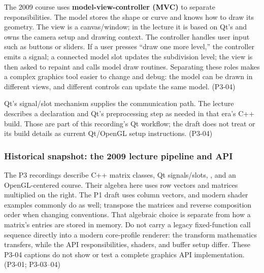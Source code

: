 \hypertarget{03-visual-computing-i-ch018-organize-the-graphics-program-with-model-view-and-controller-roles}{}

The 2009 course uses \textbf{model-view-controller (MVC)} to separate responsibilities. The model stores the shape or curve and knows how to draw its geometry. The view is a canvas/window; in the lecture it is based on Qt's  and owns the camera setup and drawing context. The controller handles user input such as buttons or sliders. If a user presses ``draw one more level,'' the controller emits a signal; a connected model slot updates the subdivision level; the view is then asked to repaint and calls model draw routines. Separating these roles makes a complex graphics tool easier to change and debug: the model can be drawn in different views, and different controls can update the same model. (P3-04)

Qt's signal/slot mechanism supplies the communication path. The lecture describes a  declaration and Qt's  preprocessing step as needed in that era's C++ build. Those are part of this recording's Qt workflow; the draft does not treat  or its build details as current Qt/OpenGL setup instructions. (P3-04)

\subsubsection{Historical snapshot: the 2009 lecture pipeline and API}\label{03-visual-computing-i-ch018-historical-snapshot-the-2009-lecture-pipeline-and-api}

\hypertarget{03-visual-computing-i-ch018-historical-snapshot-the-2009-lecture-pipeline-and-api}{}

The P3 recordings describe C++ matrix classes, Qt signals/slots, , and an OpenGL-centered course. Their algebra here uses row vectors and matrices multiplied on the right. The P1 draft uses column vectors, and modern shader examples commonly do as well; transpose the matrices and reverse composition order when changing conventions. That algebraic choice is separate from how a matrix's entries are stored in memory. Do not carry a legacy fixed-function call sequence directly into a modern core-profile renderer: the transform mathematics transfers, while the API responsibilities, shaders, and buffer setup differ. These P3-04 captions do not show or test a complete graphics API implementation. (P3-01; P3-03--04)

